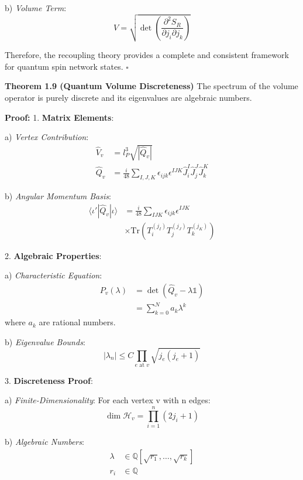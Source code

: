\documentclass[12pt,a4paper]{article}
\begin{document}
   b) \textit{Volume Term}:
      \[
      V = \sqrt{\det(\frac{\partial^2 S_R}{\partial j_i \partial j_k})}
      \]

Therefore, the recoupling theory provides a complete and consistent framework for quantum spin network states. $\square$

\textbf{Theorem 1.9 (Quantum Volume Discreteness)}
The spectrum of the volume operator is purely discrete and its eigenvalues are algebraic numbers.

\textbf{Proof:}
1. \textbf{Matrix Elements}:
   
   a) \textit{Vertex Contribution}:
      \[
      \begin{aligned}
      \hat{V}_v &= l_P^3\sqrt{|\hat{Q}_v|} \\
      \hat{Q}_v &= \frac{i}{48}\sum_{I,J,K}\epsilon_{ijk}\epsilon^{IJK}\hat{J}_i^I\hat{J}_j^J\hat{J}_k^K
      \end{aligned}
      \]
   
   b) \textit{Angular Momentum Basis}:
      \[
      \begin{aligned}
      \langle\iota'|\hat{Q}_v|\iota\rangle &= \frac{i}{48}\sum_{IJK}\epsilon_{ijk}\epsilon^{IJK} \\
      &\times \text{Tr}(T_i^{(j_I)}T_j^{(j_J)}T_k^{(j_K)})
      \end{aligned}
      \]

2. \textbf{Algebraic Properties}:
   
   a) \textit{Characteristic Equation}:
      \[
      \begin{aligned}
      P_v(\lambda) &= \det(\hat{Q}_v - \lambda\mathbb{1}) \\
      &= \sum_{k=0}^N a_k\lambda^k
      \end{aligned}
      \]
      where $a_k$ are rational numbers.
   
   b) \textit{Eigenvalue Bounds}:
      \[
      |\lambda_n| \leq C\prod_{e \text{ at } v}\sqrt{j_e(j_e+1)}
      \]

3. \textbf{Discreteness Proof}:
   
   a) \textit{Finite-Dimensionality}:
      For each vertex v with n edges:
      \[
      \dim\mathcal{H}_v = \prod_{i=1}^n(2j_i+1)
      \]
   
   b) \textit{Algebraic Numbers}:
      \[
      \begin{aligned}
      \lambda &\in \mathbb{Q}[\sqrt{r_1},\ldots,\sqrt{r_k}] \\
      r_i &\in \mathbb{Q}
      \end{aligned}
      \]
\end{document}
